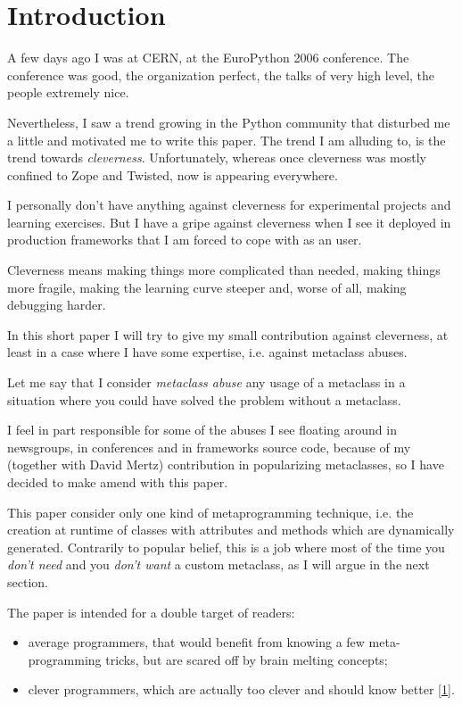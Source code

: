\documentclass[10pt,a4paper,english]{article}
\begin{document}
\section*{Introduction}

A few days ago I was at CERN, at the EuroPython 2006 conference. The
conference was good, the organization perfect, the talks of
very high level, the people extremely nice.

Nevertheless, I saw a trend growing in the Python community
that disturbed me a little and motivated
me to write this paper. The trend I am alluding to, is the trend
towards \emph{cleverness}. Unfortunately, whereas once cleverness was
mostly confined to Zope and Twisted, now is appearing everywhere.

I personally don't have anything against cleverness for
experimental projects and learning exercises. But I have a gripe
against cleverness when I see it deployed in production frameworks
that I am forced to cope with as an user.

Cleverness means making things more complicated than
needed, making things more fragile, making the learning curve
steeper and, worse of all, making debugging harder.

In this short paper I will try to give my small contribution against
cleverness, at least in a case where I have some expertise, i.e.
against metaclass abuses.

Let me say that I consider \emph{metaclass abuse} any usage of a metaclass
in a situation where you could have solved the problem without a
metaclass.

I feel in part responsible for some of the abuses I see floating
around in newsgroups, in conferences and in frameworks source code,
because of my (together with David Mertz) contribution in popularizing
metaclasses, so I have decided to make amend with this paper.

This paper consider only one kind of metaprogramming technique, i.e.
the creation at runtime of classes with attributes and methods which
are dynamically generated. Contrarily to popular belief, this is a job
where most of the time you \emph{don't need} and you \emph{don't want} a custom
metaclass, as I will argue in the next section.

The paper is intended for a double target of readers:
\begin{itemize}
\item {} 
average programmers, that would benefit from knowing a few
meta-programming tricks, but are scared off by brain melting concepts;

\item {} 
clever programmers, which are actually too clever and should know
better [\hyperlink{id2}{1}].

\end{itemize}
\end{document}
